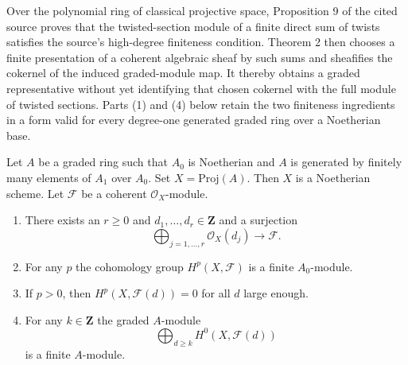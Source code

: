 \begin{lemma}
\label{lemma-coherent-on-proj}
\begin{reference}
\cite[Chapter III, \S 2, no. 60, Proposition 9 and Theorem 2,
pp. 252--253]{FAC}
\end{reference}
\begin{history}
Over the polynomial ring of classical projective space, Proposition 9 of
the cited source proves that the twisted-section module of a finite direct
sum of twists satisfies the source's high-degree finiteness condition.
Theorem 2 then chooses a finite presentation of a coherent algebraic sheaf
by such sums and sheafifies the cokernel of the induced graded-module map.
It thereby obtains a graded representative without yet identifying that
chosen cokernel with the full module of twisted sections. Parts (1) and (4)
below retain the two finiteness ingredients in a form valid for every
degree-one generated graded ring over a Noetherian base.
\end{history}
Let $A$ be a graded ring such that $A_0$ is Noetherian and
$A$ is generated by finitely many elements of $A_1$ over $A_0$.
Set $X = \text{Proj}(A)$. Then $X$ is a Noetherian scheme.
Let $\mathcal{F}$ be a coherent $\mathcal{O}_X$-module.
\begin{enumerate}
\item There exists an $r \geq 0$ and
$d_1, \ldots, d_r \in \mathbf{Z}$ and a surjection
$$
\bigoplus\nolimits_{j = 1, \ldots, r} \mathcal{O}_X(d_j)
\longrightarrow \mathcal{F}.
$$
\item For any $p$ the cohomology group $H^p(X, \mathcal{F})$ is a finite
$A_0$-module.
\item If $p > 0$, then $H^p(X, \mathcal{F}(d)) = 0$ for all $d$ large enough.
\item For any $k \in \mathbf{Z}$ the graded $A$-module
$$
\bigoplus\nolimits_{d \geq k} H^0(X, \mathcal{F}(d))
$$
is a finite $A$-module.
\end{enumerate}
\end{lemma}

